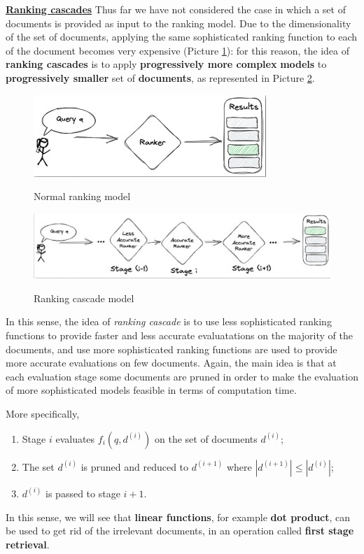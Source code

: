 \underline{\textbf{Ranking cascades}}
Thus far we have not considered the case in which a set of documents is provided as input to the ranking model. Due to the dimensionality of the set of documents, applying the same sophisticated ranking function to each of the document becomes very expensive (Picture \ref{rc}): for this reason, the idea of \textbf{ranking cascades} is to apply \textbf{progressively more complex} \textbf{models} to \textbf{progressively smaller} set of \textbf{documents}, as represented in Picture \ref{rc 1}.

\begin{figure}[h!]
		\centering
		\includegraphics[scale = 2.5]{img/ranking cascades.jpg}
        \label{rc}
        \caption{Normal ranking model}
\end{figure}

\begin{figure}[h!]
		\centering
		\includegraphics[scale = 2.5]{img/ranking cascades_1.jpg}
        \label{rc 1}
        \caption{Ranking cascade model}
\end{figure}

In this sense, the idea of \textit{ranking cascade} is to use less sophisticated ranking functions to provide faster and less accurate evaluatations on the majority of the documents, and use more sophisticated ranking functions are used to provide more accurate evaluations on few documents. Again, the main idea is that at each evaluation stage some documents are pruned in order to make the evaluation of more sophisticated models feasible in terms of computation time. 

More specifically, 

\begin{enumerate}
    \item Stage $i$ evaluates $f_i(q,d^{(i)})$ on the set of documents $d^{(i)}$;
    \item The set $d^{(i)}$ is pruned and reduced to $d^{(i+1)}$ where $|d^{(i+1)}| \leq |d^{(i)}|$;
    \item $d^{(i)}$ is passed to stage $i+1$.
\end{enumerate}

In this sense, we will see that \textbf{linear functions}, for example \textbf{dot product}, can be used to get rid of the irrelevant documents, in an operation called \textbf{first stage retrieval}.
